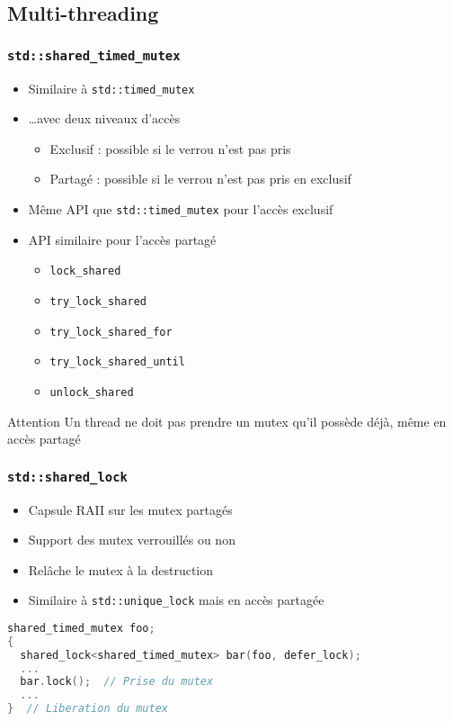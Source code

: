 \documentclass[C++.tex]{subfiles}
\begin{document}
\subsection*{Multi-threading}
\begin{frame}[fragile]
	\frametitle{\lstinline|std::shared_timed_mutex|}
	\begin{itemize}
		\item Similaire à \lstinline|std::timed_mutex|
		\item \ldots{}avec deux niveaux d'accès
		\begin{itemize}
			\item Exclusif : possible si le verrou n'est pas pris
			\item Partagé : possible si le verrou n'est pas pris en exclusif
		\end{itemize}
		\item Même API que \lstinline|std::timed_mutex| pour l'accès exclusif
		\item API similaire pour l'accès partagé
		\begin{itemize}
			\item \lstinline|lock_shared|
			\item \lstinline|try_lock_shared|
			\item \lstinline|try_lock_shared_for|
			\item \lstinline|try_lock_shared_until|
			\item \lstinline|unlock_shared|
		\end{itemize}
	\end{itemize}

	\begin{alertblock}{Attention}
		Un thread ne doit pas prendre un mutex qu'il possède déjà, même en accès partagé
	\end{alertblock}
\end{frame}

\begin{frame}[fragile]
	\frametitle{\lstinline|std::shared_lock|}
	\begin{itemize}
		\item Capsule RAII sur les mutex partagés
		\item Support des mutex verrouillés ou non
		\item Relâche le mutex à la destruction
		\item Similaire à \lstinline|std::unique_lock| mais en accès partagée
	\end{itemize}

	\begin{lstlisting}[language=C++]
shared_timed_mutex foo;
{
  shared_lock<shared_timed_mutex> bar(foo, defer_lock);
  ...
  bar.lock();  // Prise du mutex
  ...
}  // Liberation du mutex\end{lstlisting}
\end{frame}
\end{document}
